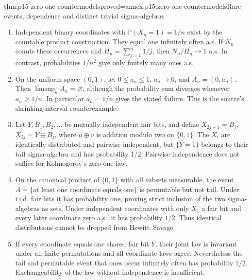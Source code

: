 \begin{hbtheorem}{thm:p15-zero-one-countermodels}{proved=annex:p15.zero-one-countermodels}{Rare events, dependence and distinct trivial sigma-algebras}
\par\nobreak
\begin{enumerate}
\item Independent binary coordinates with \(\mathbb P(X_n=1)=1/n\)
      exist by the countable product construction. They equal one
      infinitely often a.s. If \(N_n\) counts these occurrences
      and \(H_n=\sum_{j=1}^n1/j\), then \(N_n/H_n\to1\) a.s.
      In contrast, probabilities \(1/n^2\) give only finitely many
      ones a.s.
\item On the uniform space \((0,1)\), let \(0\leq a_n\leq1\),
      \(a_n\to0\), and \(A_n=(0,a_n)\). Then
      \(\limsup_n A_n=\varnothing\), although the probability
      sum diverges whenever \(a_n\geq1/n\). In particular
      \(a_n=1/n\) gives the stated failure. This is the source's
      shrinking-interval counterexample.
\item Let \(Y,B_1,B_2,\ldots\) be mutually independent fair bits,
      and define \(X_{2j-1}=B_j\), \(X_{2j}=Y\oplus B_j\),
      where \(u\oplus v\) is addition modulo two on \(\{0,1\}\).
      The \(X_i\) are identically distributed and pairwise independent,
      but \(\{Y=1\}\) belongs to their tail sigma-algebra and
      has probability \(1/2\). Pairwise independence does not suffice
      for Kolmogorov's zero-one law.
\item On the canonical product of \(\{0,1\}\) with all subsets
      measurable, the event
      \(A=\{\text{at least one coordinate equals one}\}\) is
      permutable but not tail. Under i.i.d. fair bits it has probability
      one, proving strict inclusion of the two sigma-algebras as sets.
      Under independent coordinates with only \(X_1\) a fair bit
      and every later coordinate zero a.s., it has probability \(1/2\).
      Thus identical distributions cannot be dropped from Hewitt--Savage.
\item If every coordinate equals one shared fair bit \(Y\), their
      joint law is invariant under all finite permutations and all
      coordinate laws agree. Nevertheless the tail and permutable event
      that ones occur infinitely often has probability \(1/2\).
      Exchangeability of the law without independence is insufficient.
\end{enumerate}
\end{hbtheorem}

